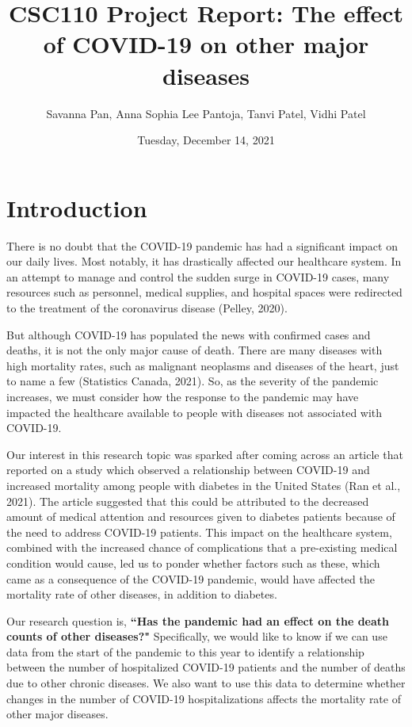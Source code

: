 \documentclass[fontsize=11pt]{article}
\title{CSC110 Project Report: The effect of COVID-19 on other major diseases}
\author{Savanna Pan, Anna Sophia Lee Pantoja, Tanvi Patel, Vidhi Patel}
\date{Tuesday, December 14, 2021}
\begin{document}
\maketitle

\section*{Introduction}

There is no doubt that the COVID-19 pandemic has had a significant impact on our daily lives. Most notably, it has drastically affected our healthcare system. In an attempt to manage and control the sudden surge in COVID-19 cases, many resources such as personnel, medical supplies, and hospital spaces were redirected to the treatment of the coronavirus disease (Pelley, 2020).

\noindent
But although COVID-19 has populated the news with confirmed cases and deaths, it is not the only major cause of death. There are many diseases with high mortality rates, such as malignant neoplasms and diseases of the heart, just to name a few (Statistics Canada, 2021). So, as the severity of the pandemic increases, we must consider how the response to the pandemic may have impacted the healthcare available to people with diseases not associated with COVID-19.  

\noindent
Our interest in this research topic was sparked after coming across an article that reported on a study which observed a relationship between COVID-19 and increased mortality among people with diabetes in the United States (Ran et al., 2021). The article suggested that this could be attributed to the decreased amount of medical attention and resources given to diabetes patients because of the need to address COVID-19 patients. This impact on the healthcare system, combined with the increased chance of complications that a pre-existing medical condition would cause, led us to ponder whether factors such as these, which came as a consequence of the COVID-19 pandemic, would have affected the mortality rate of other diseases, in addition to diabetes.


\noindent
Our research question is, \textbf{``Has the pandemic had an effect on the death counts of other diseases?"} Specifically, we would like to know if we can use data from the start of the pandemic to this year to identify a relationship between the number of hospitalized COVID-19 patients and the number of deaths due to other chronic diseases. We also want to use this data to determine whether changes in the number of COVID-19 hospitalizations affects the mortality rate of other major diseases.  
\end{document}
